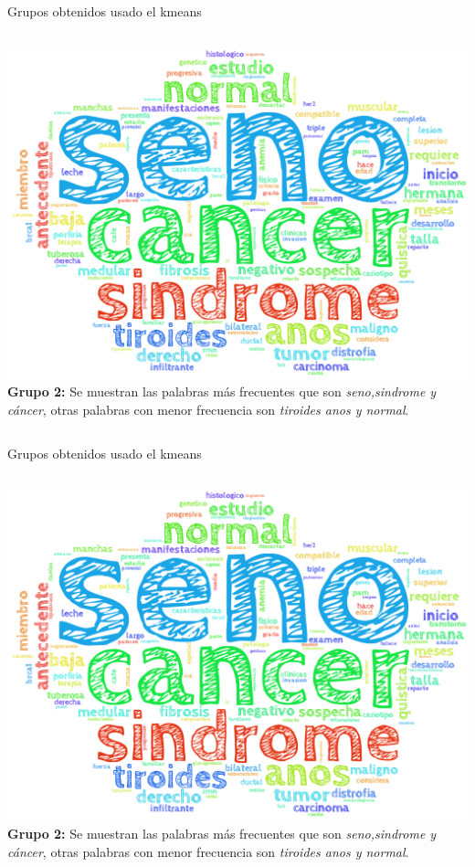 \documentclass[xcolor=dvipsnames]{beamer}
\begin{document}
\begin{frame}{Grupos obtenidos usado el kmeans}
\begin{columns}
             \centering
             \includegraphics[width=1\textwidth]{cluster2.png}
           \justifying
              \textbf{Grupo 2:} Se muestran las palabras más frecuentes que son \textit{seno,sindrome y cáncer}, otras palabras con menor frecuencia son \textit{tiroides anos y normal}.
         \end{columns}
\end{frame}

\begin{frame}{Grupos obtenidos usado el kmeans}
\begin{columns}
             \centering
             \includegraphics[width=1\textwidth]{cluster2.png}
           \justifying
              \textbf{Grupo 2:} Se muestran las palabras más frecuentes que son \textit{seno,sindrome y cáncer}, otras palabras con menor frecuencia son \textit{tiroides anos y normal}.
         \end{columns}
\end{frame}
\end{document}
